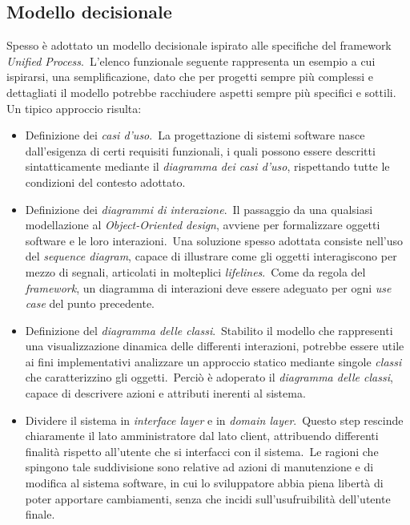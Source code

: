 \documentclass{article}
\begin{document}
\subsection*{Modello decisionale}
\large
Spesso è adottato un modello decisionale ispirato alle specifiche del framework \textit{Unified Process}.\ L'elenco funzionale seguente rappresenta un esempio a cui ispirarsi, una semplificazione, dato che per progetti sempre più complessi e dettagliati il modello potrebbe racchiudere aspetti sempre più specifici e sottili.\vspace*{14pt}\\
Un tipico approccio risulta:
\begin{itemize}
    \renewcommand{\labelitemi}{-}
    \itemsep0em
    \item Definizione dei \textit{casi d'uso}.\ La progettazione di sistemi software nasce dall'esigenza di certi requisiti funzionali, i quali possono essere descritti sintatticamente mediante il \textit{diagramma dei casi d'uso}, rispettando tutte le condizioni del contesto adottato.
    \item Definizione dei \textit{diagrammi di interazione}.\ Il passaggio da una qualsiasi modellazione al \textit{Object-Oriented design}, avviene per formalizzare oggetti software e le loro interazioni.\ Una soluzione spesso adottata consiste nell'uso del \textit{sequence diagram}, capace di illustrare come gli oggetti interagiscono per mezzo di segnali, articolati in molteplici \textit{lifelines}.\ Come da regola del \textit{framework}, un diagramma di interazioni deve essere adeguato per ogni \textit{use case} del punto precedente.
    \item Definizione del \textit{diagramma delle classi}.\ Stabilito il modello che rappresenti una visualizzazione dinamica delle differenti interazioni, potrebbe essere utile ai fini implementativi analizzare un approccio statico mediante singole \textit{classi} che caratterizzino gli oggetti.\ Perciò è adoperato il \textit{diagramma delle classi}, capace di descrivere azioni e attributi inerenti al sistema.
    \item Dividere il sistema in \textit{interface layer} e in \textit{domain layer}.\ Questo step rescinde chiaramente il lato amministratore dal lato client, attribuendo differenti finalità rispetto all'utente che si interfacci con il sistema.\ Le ragioni che spingono tale suddivisione sono relative ad azioni di manutenzione e di modifica al sistema software, in cui lo sviluppatore abbia piena libertà di poter apportare cambiamenti, senza che incidi sull'usufruibilità dell'utente finale.
\end{itemize}
\end{document}
